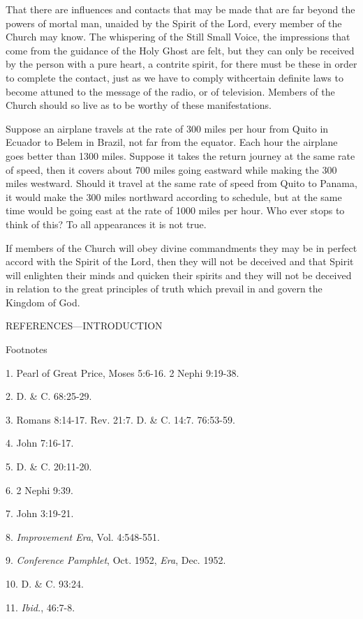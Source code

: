 That there are influences and contacts that may be made that are far beyond the powers of
mortal man, unaided by the Spirit of the Lord, every member of the Church may know. The
whispering of the Still Small Voice, the impressions that come from the guidance of the Holy
Ghost are felt, but they can only be received by the person with a pure heart, a contrite spirit,
for there must be these in order to complete the contact, just as we have to comply withcertain definite laws to become attuned to the message of the radio, or of television.
Members of the Church should so live as to be worthy of these manifestations.

Suppose an airplane travels at the rate of 300 miles per hour from Quito in Ecuador to Belem
in Brazil, not far from the equator. Each hour the airplane goes better than 1300 miles.
Suppose it takes the return journey at the same rate of speed, then it covers about 700 miles
going eastward while making the 300 miles westward. Should it travel at the same rate of
speed from Quito to Panama, it would make the 300 miles northward according to schedule,
but at the same time would be going east at the rate of 1000 miles per hour. Who ever stops
to think of this? To all appearances it is not true.

If members of the Church will obey divine commandments they may be in perfect accord
with the Spirit of the Lord, then they will not be deceived and that Spirit will enlighten their
minds and quicken their spirits and they will not be deceived in relation to the great
principles of truth which prevail in and govern the Kingdom of God.

\newpage
REFERENCES—INTRODUCTION

Footnotes

1. Pearl of Great Price, Moses 5:6-16. 2 Nephi 9:19-38.

2. D. \& C. 68:25-29.

3. Romans 8:14-17. Rev. 21:7. D. \& C. 14:7. 76:53-59.

4. John 7:16-17.

5. D. \& C. 20:11-20.

6. 2 Nephi 9:39.

7. John 3:19-21.

8. \textit{Improvement Era}, Vol. 4:548-551.

9. \textit{Conference Pamphlet}, Oct. 1952, \textit{Era}, Dec. 1952.

10. D. \& C. 93:24.

11. \textit{Ibid.}, 46:7-8.

